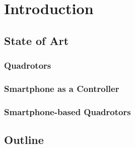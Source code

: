 \chapter{Introduction} \label{ch:introduction}

\section{State of Art}

\subsection{Quadrotors}

\subsection{Smartphone as a Controller}

\subsection{Smartphone-based Quadrotors}

\section{Outline}


